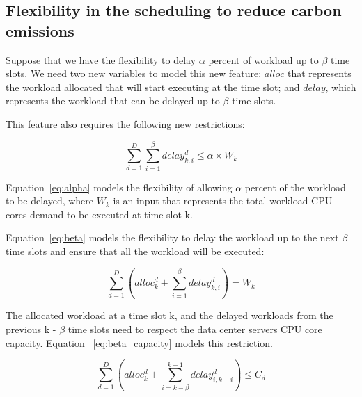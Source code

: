 \subsection{ Flexibility in the scheduling to reduce carbon emissions}

Suppose that we have the flexibility to delay $\alpha$ percent of workload up to $\beta$ time slots. We need two new variables to model this new feature: $alloc$ that represents the workload allocated that will start executing at the time slot; and $delay$, which represents the workload that can be delayed up to $\beta$ time slots.

This feature also requires the following new restrictions:

\begin{equation} \label{eq:alpha}
   \sum_{d=1}^D  \sum_{i=1}^{\beta} delay_{k,i}^d \leq  \alpha   \times W_k
\end{equation}


Equation~\eqref{eq:alpha} models the flexibility of allowing $\alpha$ percent of the workload to be delayed, where $W_k$ is an input that represents the total workload CPU cores demand to be executed at time slot k.

Equation~\eqref{eq:beta} models the flexibility to delay the workload up to the next $\beta$ time slots and ensure that all the workload will be executed:


\begin{equation} \label{eq:beta}
       \sum_{d=1}^D    (  alloc_k^d +    \sum_{i=1}^{\beta} delay_{k,i}^d  ) = W_k  
\end{equation}

The allocated workload at a time slot k, and the delayed workloads from the previous k - $\beta$ time slots need to respect the data center servers CPU core capacity. Equation ~\eqref{eq:beta_capacity} models this restriction. 

\begin{equation} \label{eq:beta_capacity}
\sum_{d=1}^D    (  alloc_k^d  +    \sum_{i=k-\beta}^{k-1} delay_{  i ,  k-i  }^d  )  \leq C_d 
\end{equation}




